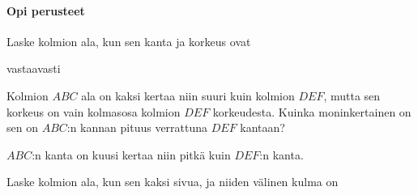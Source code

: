 
\begin{tehtavasivu}

\paragraph*{Opi perusteet}

\begin{tehtava}
Laske kolmion ala, kun sen kanta ja korkeus ovat
\begin{alakohdat}
\end{alakohdat}
vastaavasti
\begin{vastaus}
\begin{alakohdat}
\end{alakohdat}
\end{vastaus}
\end{tehtava}

\begin{tehtava}
Kolmion $ABC$ ala on kaksi kertaa niin suuri kuin kolmion $DEF$, mutta sen korkeus on vain kolmasosa kolmion $DEF$ korkeudesta. Kuinka moninkertainen on sen on $ABC$:n kannan pituus verrattuna $DEF$ kantaan?
\begin{vastaus}
$ABC$:n kanta on kuusi kertaa niin pitkä kuin $DEF$:n kanta.
\end{vastaus}
\end{tehtava}


\begin{tehtava}
Laske kolmion ala, kun sen kaksi sivua, ja niiden välinen kulma on
\begin{alakohdat}
\end{alakohdat}
\begin{vastaus}
\begin{alakohdat}
\end{alakohdat}
\end{vastaus}
\end{tehtava}


\end{tehtavasivu}
